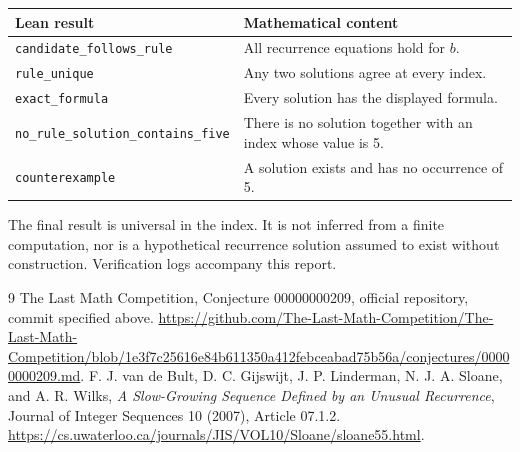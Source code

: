 \documentclass[11pt,a4paper]{article}
\begin{document}
\begin{center}
\small
\begin{tabular}{@{}lp{7.5cm}@{}}
\toprule
Lean result & Mathematical content\\
\midrule
\texttt{candidate\_follows\_rule} & All recurrence equations hold for $b$.\\
\texttt{rule\_unique} & Any two solutions agree at every index.\\
\texttt{exact\_formula} & Every solution has the displayed formula.\\
\texttt{no\_rule\_solution\_contains\_five} & There is no solution together with an index whose value is 5.\\
\texttt{counterexample} & A solution exists and has no occurrence of 5.\\
\bottomrule
\end{tabular}
\end{center}
The final result is universal in the index. It is not inferred from a
finite computation, nor is a hypothetical recurrence solution assumed to
exist without construction. Verification logs accompany this report.

\begin{thebibliography}{9}
The Last Math Competition, Conjecture 00000000209, official repository,
commit specified above.
\url{https://github.com/The-Last-Math-Competition/The-Last-Math-Competition/blob/1e3f7c25616e84b611350a412febceabad75b56a/conjectures/00000000209.md}.
F. J. van de Bult, D. C. Gijswijt, J. P. Linderman, N. J. A. Sloane,
and A. R. Wilks, \emph{A Slow-Growing Sequence Defined by an Unusual
Recurrence}, Journal of Integer Sequences 10 (2007), Article 07.1.2.
\url{https://cs.uwaterloo.ca/journals/JIS/VOL10/Sloane/sloane55.html}.
\end{thebibliography}
\end{document}
